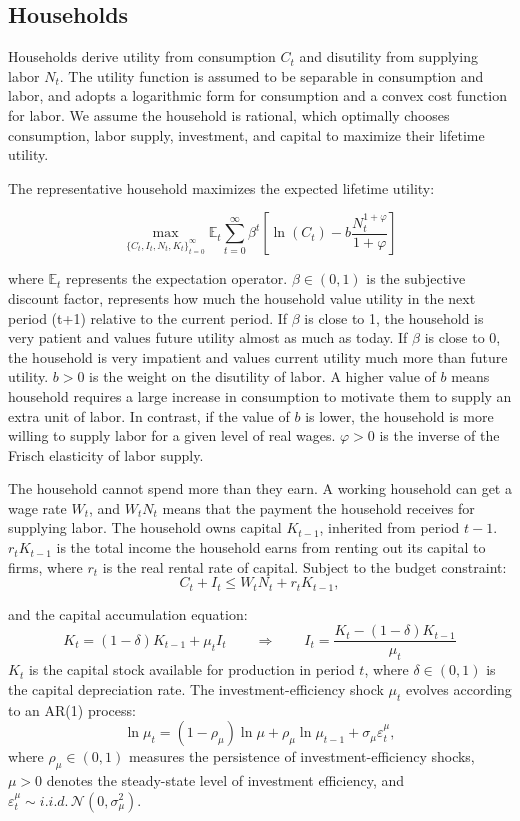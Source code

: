 \documentclass[12pt]{article}
\begin{document}
\subsection{Households}
Households derive utility from consumption $C_t$ and disutility from supplying labor $N_t$. The utility function is assumed to be separable in consumption and labor, and adopts a logarithmic form for consumption and a convex cost function for labor. We assume the household is rational, which optimally chooses consumption, labor supply, investment, and capital to maximize their lifetime utility.

The representative household maximizes the expected lifetime utility:

\[
\max_{\{C_t, I_t, N_t, K_t\}_{t=0}^{\infty}}
\mathbb{E}_{t}\sum_{t=0}^{\infty} \beta^{t}
\left[
\ln(C_t) - b \frac{N_t^{1+\varphi}}{1+\varphi}
\right]
\]
\noindent

where $\mathbb{E}_t$ represents the expectation operator. $\beta \in (0,1)$ is the subjective discount factor, represents how much the household value utility in the next period (t+1) relative to the current period. If $\beta$ is close to 1, the household is very patient and values future utility almost as much as today. If $\beta$ is close to 0, the household is very impatient and values current utility much more than future utility. $b > 0$ is the weight on the disutility of labor. A higher value of $b$ means household requires a large increase in consumption to motivate them to supply an extra unit of labor. In contrast, if the value of $b$ is lower, the household is more willing to supply labor for a given level of real wages. $\varphi > 0$ is the inverse of the Frisch elasticity of labor supply. 

The household cannot spend more than they earn. A working household can get a wage rate $W_t$, and $W_tN_t$ means that the payment the household receives for supplying labor. The household owns capital $K_{t-1}$, inherited from period $t-1$. $r_t K_{t-1}$ is the total income the household earns from renting out its capital to firms, where $r_t$ is the real rental rate of capital.
Subject to the budget constraint:
\[
C_t + I_t \le W_t N_t + r_t K_{t-1},
\]

and the capital accumulation equation:
\[
K_t = (1-\delta)K_{t-1} + \mu_t I_t
\qquad \Longrightarrow \qquad
I_t = \frac{K_t - (1-\delta)K_{t-1}}{\mu_t}
\tag{7}
\]
$K_t$ is the capital stock available for production in period $t$, where $\delta \in (0,1)$ is the capital depreciation rate. The investment-efficiency shock $\mu_t$ evolves according to an AR(1) process:
\[
\ln \mu_t = (1-\rho_\mu)\ln \mu + \rho_\mu \ln \mu_{t-1} + \sigma_\mu \varepsilon_t^\mu,
\tag{4}
\]
where $\rho_\mu \in (0,1)$ measures the persistence of investment-efficiency shocks, 
$\mu>0$ denotes the steady-state level of investment efficiency, and 
$\varepsilon_t^\mu \sim i.i.d.\,\mathcal{N}(0,\sigma_\mu^2)$.
\end{document}
